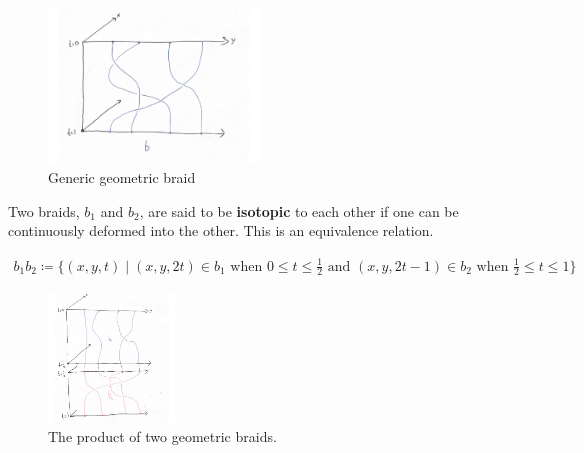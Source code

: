 \documentclass[compress,aspectratio=169,10pt,usenames,dvipsnames]{beamer}
\begin{document}
\begin{frame}
\vfill
\begin{figure}[H]
	\centering
	\includegraphics[width=0.5\textwidth]{geobraid.png}
	\caption{Generic geometric braid}
\end{figure}
\vfill
\begin{definition}
	Two braids, $b_1$ and $b_2$, are said to be \textbf{isotopic} to each other if one can be continuously deformed into the other. This is an equivalence relation.
\end{definition}
\vfill
\end{frame}
%
%
\begin{frame}
\vfill
\begin{equation}
\begin{aligned}
	b_1b_2 \coloneq \{(x,y,t)\mid (x,y,2t)\in b_1 \text{ when }0\leq t\leq \frac{1}{2} \text{ and }   (x,y,2t - 1)\in b_2 \text{ when }\frac{1}{2}\leq t\leq 1\}
\end{aligned}
\end{equation}
\vfill
\begin{figure}[H]
	\centering
	\includegraphics[width=0.3\textwidth]{geobraidprod.png}
	\caption{The product of two geometric braids.}
\end{figure}
\vfill
\end{frame}
\end{document}
